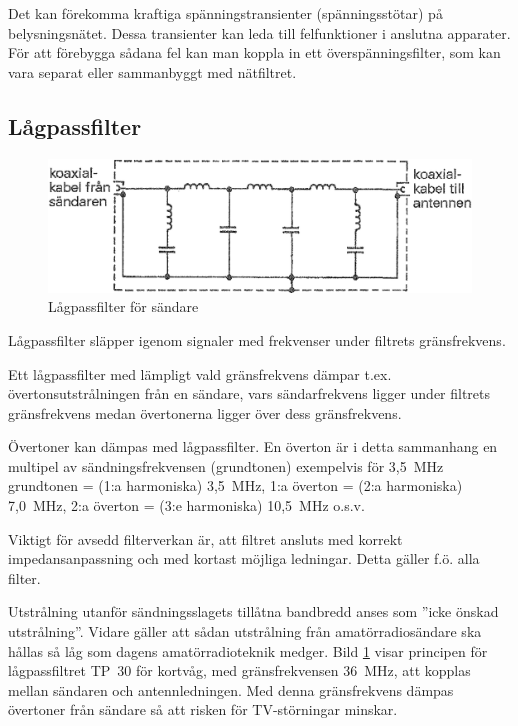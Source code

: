 Det kan förekomma kraftiga spänningstransienter (spänningsstötar) på
belysningsnätet. Dessa transienter kan leda till felfunktioner i anslutna
apparater. För att förebygga sådana fel kan man koppla in ett
överspänningsfilter, som kan vara separat eller sammanbyggt med nätfiltret.

\subsection{Lågpassfilter}

\begin{figure}
  \includegraphics[width=\textwidth]{images/cropped_pdfs/bild_2_9-02.pdf}
  \caption{Lågpassfilter för sändare}
  \label{fig:bildII9-2}
\end{figure}

Lågpassfilter släpper igenom signaler med frekvenser under filtrets
gränsfrekvens.

Ett lågpassfilter med lämpligt vald gränsfrekvens dämpar t.ex.
övertonsutstrålningen från en sändare, vars sändarfrekvens ligger under filtrets
gränsfrekvens medan övertonerna ligger över dess gränsfrekvens.

Övertoner kan dämpas med lågpassfilter. En överton är i detta sammanhang en
multipel av sändningsfrekvensen (grundtonen) exempelvis för 3,5~MHz
grundtonen = (1:a harmoniska) 3,5~MHz, 1:a överton = (2:a harmoniska) 7,0~MHz,
2:a överton = (3:e harmoniska) 10,5~MHz o.s.v.

Viktigt för avsedd filterverkan är, att filtret ansluts med korrekt
impedansanpassning och med kortast möjliga ledningar. Detta gäller
f.ö. alla filter.

Utstrålning utanför sändningsslagets tillåtna bandbredd anses som
''icke önskad utstrålning''. Vidare gäller att sådan utstrålning från
amatörradiosändare ska hållas så låg som dagens amatörradioteknik medger.
Bild \ref{fig:bildII9-2} visar principen för lågpassfiltret TP~30 för kortvåg,
med gränsfrekvensen 36~MHz, att kopplas mellan sändaren och antennledningen.
Med denna gränsfrekvens dämpas övertoner från sändare så att risken för
TV-störningar minskar.

